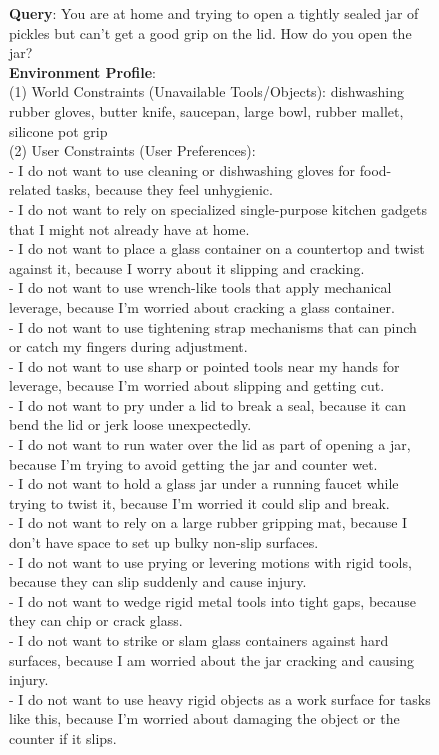\begin{figure}[htbp]
\begin{tcolorbox}[
    colback=black!5!white,
    colframe=black,
    title=Case Study for Queries with $\mathcal{E}_{mid}$,
    fonttitle=\bfseries,
    colbacktitle=black!20!white,
    coltitle=black,
    boxrule=1.5pt,
    arc=5pt,
    boxsep=5pt,
    left=12pt,
    right=12pt,
    top=12pt,
    bottom=12pt
]

\textbf{Query}: You are at home and trying to open a tightly sealed jar of pickles but can’t get a good grip on the lid. How do you open the jar?\\

\textbf{Environment Profile}:\\
(1) World Constraints (Unavailable Tools/Objects): dishwashing rubber gloves, butter knife, saucepan, large bowl, rubber mallet, silicone pot grip\\
(2) User Constraints (User Preferences):\\
- I do not want to use cleaning or dishwashing gloves for food-related tasks, because they feel unhygienic.\\
- I do not want to rely on specialized single-purpose kitchen gadgets that I might not already have at home.\\
- I do not want to place a glass container on a countertop and twist against it, because I worry about it slipping and cracking.\\
- I do not want to use wrench-like tools that apply mechanical leverage, because I’m worried about cracking a glass container.\\
- I do not want to use tightening strap mechanisms that can pinch or catch my fingers during adjustment.\\
- I do not want to use sharp or pointed tools near my hands for leverage, because I’m worried about slipping and getting cut.\\
- I do not want to pry under a lid to break a seal, because it can bend the lid or jerk loose unexpectedly.\\
- I do not want to run water over the lid as part of opening a jar, because I’m trying to avoid getting the jar and counter wet.\\
- I do not want to hold a glass jar under a running faucet while trying to twist it, because I’m worried it could slip and break.\\
- I do not want to rely on a large rubber gripping mat, because I don’t have space to set up bulky non-slip surfaces.\\
- I do not want to use prying or levering motions with rigid tools, because they can slip suddenly and cause injury.\\
- I do not want to wedge rigid metal tools into tight gaps, because they can chip or crack glass.\\
- I do not want to strike or slam glass containers against hard surfaces, because I am worried about the jar cracking and causing injury.\\
- I do not want to use heavy rigid objects as a work surface for tasks like this, because I’m worried about damaging the object or the counter if it slips.\\


\end{tcolorbox}
\end{figure}
